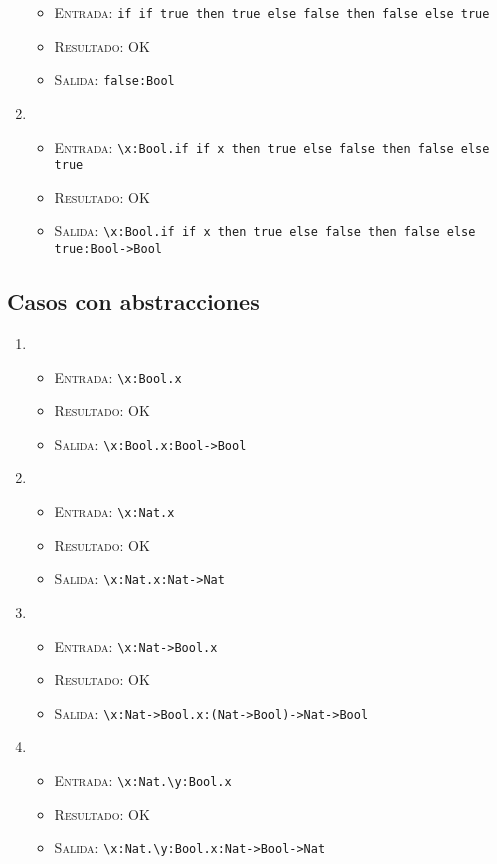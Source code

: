 \documentclass[11pt]{article}
\newcounter{savedenum}
\newcommand{\saveenum}{\setcounter{savedenum}{\theenumi}}
\newcommand{\loadenum}{\setcounter{enumi}{\thesavedenum}}
\begin{document}
\begin{enumerate}
\begin{itemize}
    \item \textsc{Entrada:}   \verb|if if true then true else false then false else true|
    \item \textsc{Resultado:} OK
    \item \textsc{Salida:}    \verb|false:Bool|
    \end{itemize}
\item \begin{itemize}
    \item \textsc{Entrada:}   \verb|\x:Bool.if if x then true else false then false else true|
    \item \textsc{Resultado:} OK
    \item \textsc{Salida:}    \verb|\x:Bool.if if x then true else false then false else true:Bool->Bool| \\
    \end{itemize}
\saveenum
\end{enumerate}

\subsection{Casos con abstracciones}
\begin{enumerate}
\loadenum
\item \begin{itemize}
    \item \textsc{Entrada:}   \verb|\x:Bool.x|
    \item \textsc{Resultado:} OK
    \item \textsc{Salida:}    \verb|\x:Bool.x:Bool->Bool|
    \end{itemize}
\item \begin{itemize}
    \item \textsc{Entrada:}   \verb|\x:Nat.x|
    \item \textsc{Resultado:} OK
    \item \textsc{Salida:}    \verb|\x:Nat.x:Nat->Nat|
    \end{itemize}
\item \begin{itemize}
    \item \textsc{Entrada:}   \verb|\x:Nat->Bool.x|
    \item \textsc{Resultado:} OK
    \item \textsc{Salida:}    \verb|\x:Nat->Bool.x:(Nat->Bool)->Nat->Bool|
    \end{itemize}
\item \begin{itemize}
    \item \textsc{Entrada:}   \verb|\x:Nat.\y:Bool.x|
    \item \textsc{Resultado:} OK
    \item \textsc{Salida:}    \verb|\x:Nat.\y:Bool.x:Nat->Bool->Nat| \\
    \end{itemize}
\saveenum
\end{enumerate}
\end{document}
